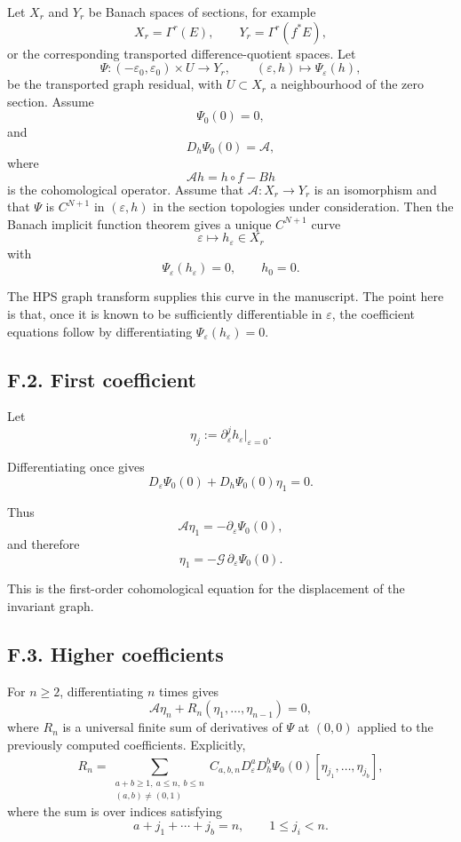 \documentclass[12pt,a4paper]{article}
\theoremstyle{plain}
\numberwithin{equation}{section}
\numberwithin{theorem}{section}
\begin{document}
Let $X_r$ and $Y_r$ be Banach spaces of sections, for example
\[
X_r=\Gamma^r(E),
\qquad
Y_r=\Gamma^r(f^*E),
\]
or the corresponding transported difference-quotient spaces. Let
\[
\Psi:(-\varepsilon_0,
\varepsilon_0)\times U\to Y_r,
\qquad
(\varepsilon,h)
\mapsto
\Psi_\varepsilon(h),
\]
be the transported graph residual, with $U\subset X_r$ a neighbourhood of the zero section. Assume
\[
\Psi_0(0)=0,
\]
and
\[
D_h\Psi_0(0)=\mathcal A,
\]
where
\[
\mathcal A h=h\circ f-Bh
\]
is the cohomological operator. Assume that $\mathcal A:X_r\to Y_r$ is an isomorphism and that $\Psi$ is $C^{N+1}$ in $(\varepsilon,h)$ in the section topologies under consideration. Then the Banach implicit function theorem gives a unique $C^{N+1}$ curve
\[
\varepsilon\mapsto h_\varepsilon\in X_r
\]
with
\[
\Psi_\varepsilon(h_\varepsilon)=0,
\qquad
h_0=0.
\]

The HPS graph transform supplies this curve in the manuscript. The point here is that, once it is known to be sufficiently differentiable in $\varepsilon$, the coefficient equations follow by differentiating $\Psi_\varepsilon(h_\varepsilon)=0$.

\subsection{F.2. First coefficient}

Let
\[\eta_j:=\partial_\varepsilon^j h_\varepsilon|_{\varepsilon=0}.
\]

Differentiating once gives
\[
D_\varepsilon\Psi_0(0)+D_h\Psi_0(0)\eta_1=0.
\]

Thus
\[
\mathcal A\eta_1
=
-\partial_\varepsilon\Psi_0(0),
\]
and therefore
\[\eta_1
=
-
\mathcal G\,
\partial_\varepsilon\Psi_0(0).
\]

This is the first-order cohomological equation for the displacement of the invariant graph.

\subsection{F.3. Higher coefficients}

For $n\ge2$, differentiating $n$ times gives
\[
\mathcal A\eta_n+R_n(\eta_1,
\ldots,
\eta_{n-1})=0,
\]
where $R_n$ is a universal finite sum of derivatives of $\Psi$ at $(0,0)$ applied to the previously computed coefficients. Explicitly,
\[
R_n
=
\sum_{
\substack{a+b\ge1,\ a\le n,\ b\le n\\
(a,b)\ne(0,1)}}
C_{a,b,n}
D_\varepsilon^aD_h^b\Psi_0(0)
[\eta_{j_1},
\ldots,
\eta_{j_b}
],
\]
where the sum is over indices satisfying
\[
a+j_1+\cdots+j_b=n,
\qquad
1\le j_i<n.
\]
\end{document}
